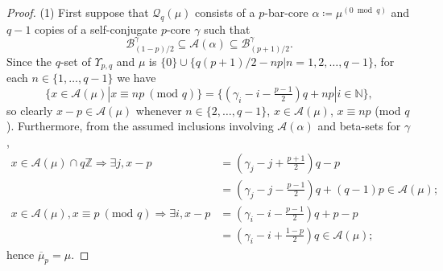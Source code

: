 \documentclass[ALCO, Unicode,published]{cedram}
\newcommand*\nicefrac[2]{#1/#2}
\begin{document}
\begin{proof}
(1) First suppose that $\mathcal{Q}_q(\mu)$ consists of a $p$-bar-core $\alpha\coloneqq\mu^{(0\bmod q)}$ and $q-1$ copies of a self-conjugate $p$-core $\gamma$ such that 
$$\mathcal{B}^\gamma_{\nicefrac{(1-p)}{2}}\subseteq\mathcal{A}(\alpha)\subseteq\mathcal{B}^\gamma_{\nicefrac{(p+1)}{2}}.$$ 
Since the $q$-set of $\Upsilon_{p,q}$ and $\mu$ is $\{0\}\cup\{\nicefrac{q(p+1)}{2}-np|n=1,2,\dots,q-1\}$, for each $n\in\{1,\dots,q-1\}$ we have 
$$\{x\in\mathcal{A}(\mu)|x\equiv np\:(\text{mod }q)\}=\{(\gamma_i-i-\tfrac{p-1}{2})q+np|i\in\mathbb{N}\},$$ 
so clearly $x-p\in\mathcal{A}(\mu)$ whenever $n\in\{2,\dots,q-1\}$, $x\in\mathcal{A}(\mu)$, $x\equiv np$ (mod $q$). Furthermore, from the assumed inclusions involving $\mathcal{A}(\alpha)$ and beta-sets for $\gamma$, 
\begin{align*}
x\in\mathcal{A}(\mu)\cap q\mathbb{Z}\Rightarrow\exists j,x-p&=(\gamma_j-j+\tfrac{p+1}{2})q-p\\
&=(\gamma_j-j-\tfrac{p-1}{2})q+(q-1)p\in\mathcal{A}(\mu);\\
x\in\mathcal{A}(\mu),x\equiv p\:(\text{mod }q)\Rightarrow\exists i,x-p&=(\gamma_i-i-\tfrac{p-1}{2})q+p-p\\
&=(\gamma_i-i+\tfrac{1-p}{2})q\in\mathcal{A}(\mu);
\end{align*}
hence $\overline{\mu}_p=\mu$. 


\end{proof}
\end{document}
